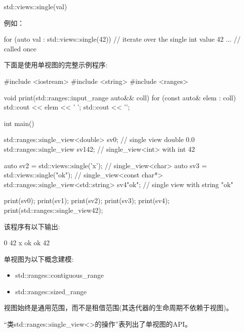 \begin{cpp}
std::views::single(val)
\end{cpp}

例如：

\begin{cpp}
for (auto val : std::views::single(42)) { // iterate over the single int value 42
	... // called once
}
\end{cpp}

下面是使用单视图的完整示例程序:


\begin{cpp}
#include <iostream>
#include <string>
#include <ranges>

void print(std::ranges::input_range auto&& coll)
{
	for (const auto& elem : coll) {
		std::cout << elem << ' ';
	}
	std::cout << '\n';
}

int main()
{
	std::ranges::single_view<double> sv0; // single view double 0.0
	std::ranges::single_view sv1{42}; // single_view<int> with int 42
	
	auto sv2 = std::views::single('x'); // single_view<char>
	auto sv3 = std::views::single("ok"); // single_view<const char*>
	std::ranges::single_view<std::string> sv4{"ok"}; // single view with string "ok"
	
	print(sv0);
	print(sv1);
	print(sv2);
	print(sv3);
	print(sv4);
	print(std::ranges::single_view{42});
}
\end{cpp}

该程序有以下输出:

\begin{shell}
0
42
x
ok
ok
42
\end{shell}


单视图为以下概念建模:

\begin{itemize}
\item
std::ranges::contiguous\_range

\item
std::ranges::sized\_range
\end{itemize}

视图始终是通用范围，而不是租借范围(其迭代器的生命周期不依赖于视图)。


“类std::ranges::single\_view<>的操作”表列出了单视图的API。

